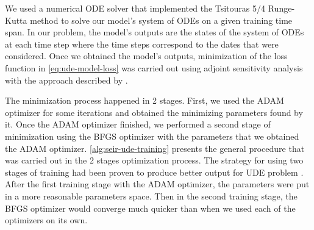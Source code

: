 We used a numerical \gls{ODE} solver that implemented the Tsitouras 5/4 Runge-Kutta method \cite{tsitourasRungeKuttaPairs2011} to solve our model's system of \glspl{ODE} on a given training time span.
In our problem, the model's outputs are the states of the system of \glspl{ODE} at each time step where the time steps correspond to the dates that were considered.
Once we obtained the model's outputs, minimization of the loss function in \autoref{eq:ude-model-loss} was carried out using adjoint sensitivity analysis \cite{maComparisonAutomaticDifferentiation2021} with the approach described by \citeauthor{rackauckasUniversalDifferentialEquations2020} \cite{rackauckasUniversalDifferentialEquations2020}.

The minimization process happened in 2 stages.
First, we used the ADAM optimizer \cite{kingmaAdamMethodStochastic2017} for some iterations and obtained the minimizing parameters found by it.
Once the ADAM optimizer finished, we performed a second stage of minimization using the BFGS optimizer \cite{broydenConvergenceClassDoublerank1970, fletcherNewApproachVariable1970, goldfarbFamilyVariablemetricMethods1970, shannoConditioningQuasiNewtonMethods1970} with the parameters that we obtained the ADAM optimizer.
\autoref{alg:seir-ude-training} presents the general procedure that was carried out in the 2 stages optimization process.
The strategy for using two stages of training had been proven to produce better output for \gls{UDE} problem \cite{rackauckasUniversalDifferentialEquations2020}.
After the first training stage with the ADAM optimizer, the parameters were put in a more reasonable parameters space.
Then in the second training stage, the BFGS optimizer would converge much quicker than when we used each of the optimizers on its own.


